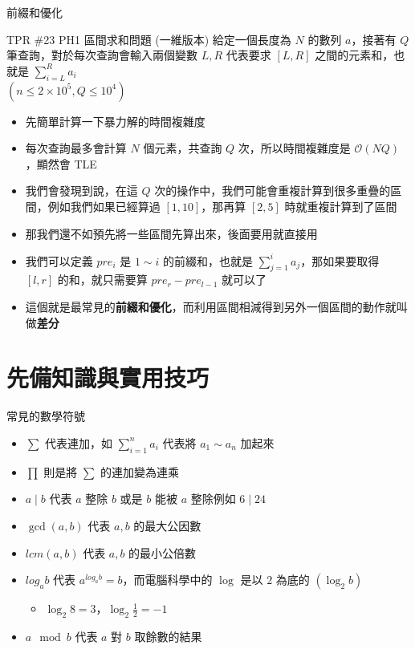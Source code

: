 \documentclass[aspectratio=169]{beamer}
\begin{document}
	\begin{frame}{前綴和優化}
		\begin{block}{TPR \#23 PH1 區間求和問題 (一維版本)}
			給定一個長度為 $N$ 的數列 $a$，接著有 $Q$ 筆查詢，對於每次查詢會輸入兩個變數 $L, R$ 代表要求 $[L, R]$ 之間的元素和，也就是 $\sum_{i=L}^{R}{a_i}$\\
			$(n \le 2 \times 10^5, Q \le 10^4)$
		\end{block}

		\begin{itemize}
			\item<2-> 先簡單計算一下暴力解的時間複雜度
			\item<3-> 每次查詢最多會計算 $N$ 個元素，共查詢 $Q$ 次，所以時間複雜度是 $\mathcal{O}(NQ)$，顯然會 TLE
			\item<4-> 我們會發現到說，在這 $Q$ 次的操作中，我們可能會重複計算到很多重疊的區間，例如我們如果已經算過 $[1, 10]$，那再算 $[2, 5]$ 時就重複計算到了區間
			\item<5-> 那我們還不如預先將一些區間先算出來，後面要用就直接用
			\item<6-> 我們可以定義 $pre_i$ 是 $1 \sim i$ 的前綴和，也就是 $\sum_{j=1}^{i}{a_j}$，那如果要取得 $[l, r]$ 的和，就只需要算 $pre_r - pre_{l-1}$ 就可以了
			\item<7-> 這個就是最常見的\textbf{前綴和優化}，而利用區間相減得到另外一個區間的動作就叫做\textbf{差分}
		\end{itemize}
	\end{frame}

	\section{先備知識與實用技巧}

	\begin{frame}{常見的數學符號}
		\begin{itemize}
			\item $\sum$ 代表連加，如 $\displaystyle\sum_{i=1}^{n}{a_i}$ 代表將 $a_1 \sim a_n$ 加起來
			\item $\prod$ 則是將 $\sum$ 的連加變為連乘
			\item $a \mid b$ 代表 $a$ 整除 $b$ 或是 $b$ 能被 $a$ 整除例如 $6 \mid 24$
			\item $\gcd(a, b)$ 代表 $a,b$ 的最大公因數
			\item $lcm(a, b)$ 代表 $a,b$ 的最小公倍數
			\item $log_a{b}$ 代表 $a^{log_a{b}} = b$，而電腦科學中的 $\log$ 是以 $2$ 為底的 $(\log_2{b})$
				\begin{itemize}
					\item $\log_2{8}=3$，$\log_2{\frac{1}{2}}=-1$
				\end{itemize}
			\item $a\mod{b}$ 代表 $a$ 對 $b$ 取餘數的結果
		\end{itemize}
	\end{frame}
\end{document}
